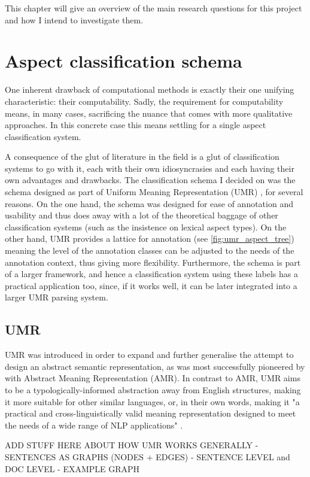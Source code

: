 This chapter will give an overview of the main research questions for this project and how I intend to investigate them.

\section{Aspect classification schema}
One inherent drawback of computational methods is exactly their one unifying characteristic: their computability. Sadly, the requirement for computability means, in many cases, sacrificing the nuance that comes with more qualitative approaches. In this concrete case this means settling for a single aspect classification system. 

A consequence of the glut of literature in the field is a glut of classification systems to go with it, each with their own idiosyncrasies and each having their own advantages and drawbacks. The classification schema I decided on was the schema designed as part of Uniform Meaning Representation (UMR) \citep{umr}, for several reasons. On the one hand, the schema was designed for ease of annotation and usability and thus does away with a lot of the theoretical baggage of other classification systems (such as the insistence on lexical aspect types). On the other hand, UMR provides a lattice for annotation (see \ref{fig:umr_aspect_tree}) meaning the level of the annotation classes can be adjusted to the needs of the annotation context, thus giving more flexibility. Furthermore, the schema is part of a larger framework, and hence a classification system using these labels has a practical application too, since, if it works well, it can be later integrated into a larger UMR parsing system.

\subsection{UMR}
\label{sect:umr}
UMR \citep{umr} was introduced in order to expand and further generalise the attempt to design an abstract semantic representation, as was most successfully pioneered by \citet{amr} with Abstract Meaning Representation (AMR). In contrast to AMR, UMR aims to be a typologically-informed abstraction away from English structures, making it more suitable for other similar languages, or, in their own words, making it "a practical and cross-linguistically valid meaning representation designed to meet the needs of a wide range of NLP applications" \citep{umr}.

ADD STUFF HERE ABOUT HOW UMR WORKS GENERALLY
- SENTENCES AS GRAPHS (NODES + EDGES)
- SENTENCE LEVEL and DOC LEVEL
- EXAMPLE GRAPH

